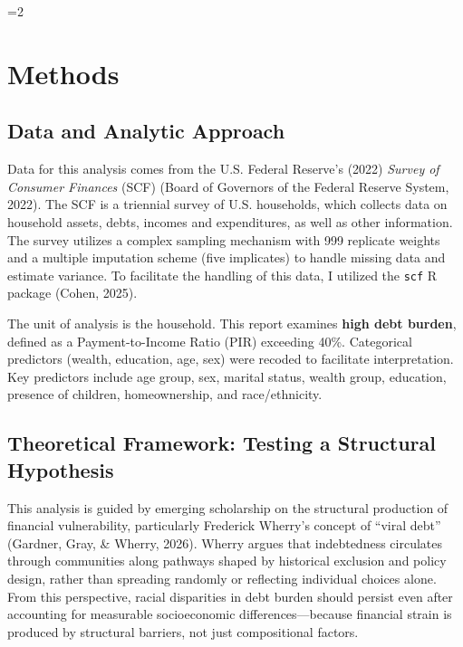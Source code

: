 \documentclass[12pt]{article}
\newif\ifjncanon
\newcommand{\jncmaincolumns}{1}
\begin{document}
\ifnum\jncmaincolumns=2\relax
  \twocolumn
\fi

\ifjncanon
\begingroup
\small
\noindent\textit{This manuscript is set to anonymous mode. Identifying metadata fields are suppressed on the title page.}\par
\endgroup
\vspace{1em}
\fi

\section{Methods}\label{methods}

\subsection{Data and Analytic
Approach}\label{data-and-analytic-approach}

Data for this analysis comes from the U.S. Federal Reserve's (2022)
\emph{Survey of Consumer Finances} (SCF) (Board of Governors of the
Federal Reserve System, 2022). The SCF is a triennial survey of U.S.
households, which collects data on household assets, debts, incomes and
expenditures, as well as other information. The survey utilizes a
complex sampling mechanism with 999 replicate weights and a multiple
imputation scheme (five implicates) to handle missing data and estimate
variance. To facilitate the handling of this data, I utilized the
\texttt{scf} R package (Cohen, 2025).

The unit of analysis is the household. This report examines \textbf{high
debt burden}, defined as a Payment-to-Income Ratio (PIR) exceeding 40\%.
Categorical predictors (wealth, education, age, sex) were recoded to
facilitate interpretation. Key predictors include age group, sex,
marital status, wealth group, education, presence of children,
homeownership, and race/ethnicity.

\subsection{Theoretical Framework: Testing a Structural
Hypothesis}\label{theoretical-framework-testing-a-structural-hypothesis}

This analysis is guided by emerging scholarship on the structural
production of financial vulnerability, particularly Frederick Wherry's
concept of ``viral debt'' (Gardner, Gray, \& Wherry, 2026). Wherry
argues that indebtedness circulates through communities along pathways
shaped by historical exclusion and policy design, rather than spreading
randomly or reflecting individual choices alone. From this perspective,
racial disparities in debt burden should persist even after accounting
for measurable socioeconomic differences---because financial strain is
produced by structural barriers, not just compositional factors.
\end{document}
